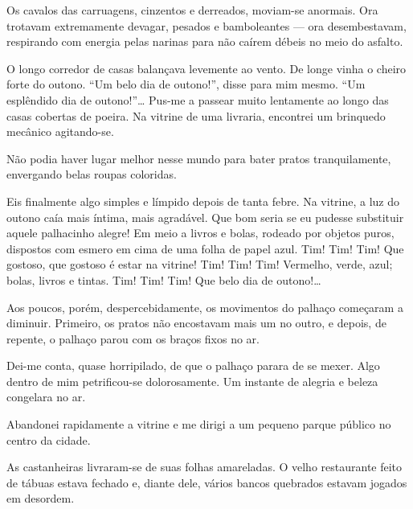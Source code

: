 Os cavalos das carruagens, cinzentos e derreados, moviam-se anormais. Ora
trotavam extremamente devagar, pesados e bamboleantes --- ora desembestavam,
respirando com energia pelas narinas para não caírem débeis no meio do
asfalto.

O longo corredor de casas balançava levemente ao vento. De longe vinha o
cheiro forte do outono. ``Um belo dia de outono!'', disse para mim mesmo.
``Um esplêndido dia de outono!''\ldots{} Pus-me a passear muito lentamente ao
longo das casas cobertas de poeira. Na vitrine de uma livraria, encontrei um
brinquedo mecânico agitando-se.



Não podia haver lugar melhor nesse mundo para bater pratos tranquilamente,
envergando belas roupas coloridas.

Eis finalmente algo simples e límpido depois de tanta febre. Na vitrine, a luz
do outono caía mais íntima, mais agradável. Que bom seria se eu pudesse
substituir aquele palhacinho alegre! Em meio a livros e bolas, rodeado por
objetos puros, dispostos com esmero em cima de uma folha de papel azul. Tim!
Tim! Tim! Que gostoso, que gostoso é estar na vitrine! Tim! Tim! Tim!
Vermelho, verde, azul; bolas, livros e tintas. Tim! Tim! Tim! Que belo dia de
outono!\ldots{}

Aos poucos, porém, despercebidamente, os movimentos do palhaço começaram a
diminuir. Primeiro, os pratos não encostavam mais um no outro, e depois, de
repente, o palhaço parou com os braços fixos no ar.

Dei-me conta, quase horripilado, de que o palhaço parara de se mexer. Algo
dentro de mim petrificou-se dolorosamente. Um instante de alegria e beleza
congelara no ar.

Abandonei rapidamente a vitrine e me dirigi a um pequeno parque público no
centro da cidade.

As castanheiras livraram-se de suas folhas amareladas. O velho restaurante
feito de tábuas estava fechado e, diante dele, vários bancos quebrados
estavam jogados em desordem.


